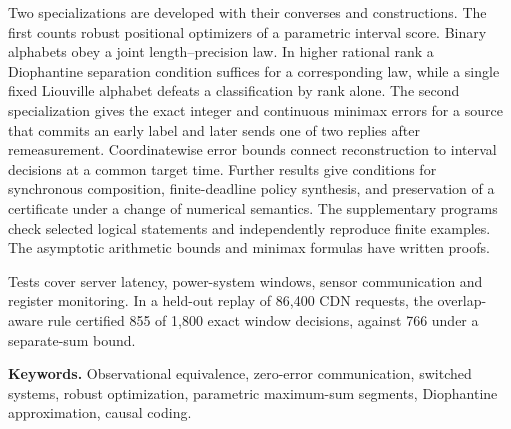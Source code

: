 \documentclass[11pt,a4paper]{article}
\theoremstyle{definition}
\begin{document}
Two specializations are developed with their converses and constructions. The first counts robust positional optimizers of a parametric interval score. Binary alphabets obey a joint length--precision law. In higher rational rank a Diophantine separation condition suffices for a corresponding law, while a single fixed Liouville alphabet defeats a classification by rank alone. The second specialization gives the exact integer and continuous minimax errors for a source that commits an early label and later sends one of two replies after remeasurement. Coordinatewise error bounds connect reconstruction to interval decisions at a common target time. Further results give conditions for synchronous composition, finite-deadline policy synthesis, and preservation of a certificate under a change of numerical semantics. The supplementary programs check selected logical statements and independently reproduce finite examples. The asymptotic arithmetic bounds and minimax formulas have written proofs.

Tests cover server latency, power-system windows, sensor communication and register monitoring. In a held-out replay of 86,400 CDN requests, the overlap-aware rule certified 855 of 1,800 exact window decisions, against 766 under a separate-sum bound.

\noindent\textbf{Keywords.} Observational equivalence, zero-error communication, switched systems, robust optimization, parametric maximum-sum segments, Diophantine approximation, causal coding.
\newpage{\setlength{\parskip}{3.5pt}\tableofcontents}\clearpage{}









\newcommand{\edtext}[2]{#1}


\appendix


\clearpage{}
\begingroup\small

\endgroup
\end{document}
